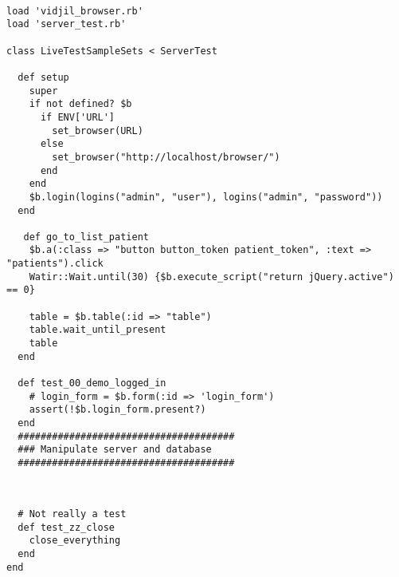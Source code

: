 
\begin{verbatim}

load 'vidjil_browser.rb'
load 'server_test.rb'

class LiveTestSampleSets < ServerTest

  def setup
    super
    if not defined? $b
      if ENV['URL']
        set_browser(URL)
      else
        set_browser("http://localhost/browser/")
      end
    end
    $b.login(logins("admin", "user"), logins("admin", "password"))
  end

   def go_to_list_patient
    $b.a(:class => "button button_token patient_token", :text => "patients").click
    Watir::Wait.until(30) {$b.execute_script("return jQuery.active") == 0}

    table = $b.table(:id => "table")
    table.wait_until_present
    table
  end

  def test_00_demo_logged_in
    # login_form = $b.form(:id => 'login_form')
    assert(!$b.login_form.present?)
  end
  ######################################
  ### Manipulate server and database
  ######################################


\end{verbatim}



\begin{verbatim}

  # Not really a test
  def test_zz_close
    close_everything
  end
end
\end{verbatim}